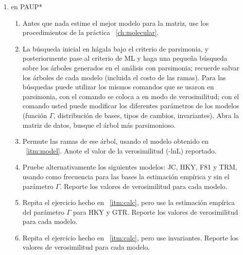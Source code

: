 \begin{enumerate} 
 \item{en PAUP*}
	\begin{enumerate} 
		\item \label{itm:model} Antes que nada estime el mejor modelo para la matriz, use los procedimientos de la pr\'actica ~\ref{ch:molecular}. 

		
		\item \label{itm:calc} La b\'usqueda inicial en  h\'agala bajo el criterio de parsimonia, y posteriormente pase al criterio de ML y haga una \textrm{peque\~na} b\'usqueda sobre los \'arboles generados en el an\'alisis con parsimonia; recuerde salvar los \'arboles de cada modelo (incluida el costo de las ramas). Para las b\'usquedas puede utilizar los mismos comandos que se usaron en parsimonia, con el comando  se coloca a  en modo de verosimilitud; con el comando  usted puede modificar los diferentes par\'ametros de los modelos (funci\'on $\Gamma$, distribuci\'on de bases, tipos de cambios, invariantes). Abra la matriz de datos, busque el \'arbol m\'as parsimonioso.
		\item Permute las ramas de ese \'arbol, usando el modelo obtenido en ~\ref{itm:model}. Anote el valor de la verosimilitud (-lnL) reportado.
		\item  Pruebe alternativamente los siguientes modelos: JC, HKY, F81 y TRM, usando como frecuencia para las bases la estimaci\'on emp\'irica y sin el par\'ametro $\Gamma$. Reporte los valores de verosimilitud para cada modelo.


		\item Repita el ejercicio hecho en ~\ref{itm:calc}, pero use la estimaci\'on emp\'irica del par\'ametro $\Gamma$ para HKY y GTR. Reporte los valores de verosimilitud para cada modelo.
		
		\item Repita el ejercicio hecho en ~\ref{itm:calc}, pero use invariantes. Reporte los valores de verosimilitud para cada modelo.
	\end{enumerate}


\end{enumerate}

